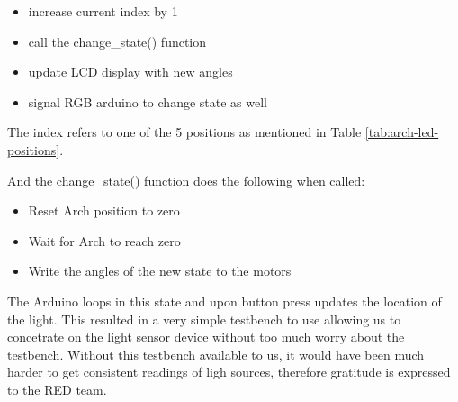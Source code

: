 \begin{itemize}
  \item increase current index by 1
  \item call the change\_state() function 
  \item update LCD display with new angles
  \item signal RGB arduino to change state as well
\end{itemize}

The index refers to one of the 5 positions as mentioned in Table \ref{tab:arch-led-positions}. 

And the change\_state() function does the following when called:
\begin{itemize}
  \item Reset Arch position to zero
  \item Wait for Arch to reach zero
  \item Write the angles of the new state to the motors
\end{itemize}

The Arduino loops in this state and upon button press updates the location of the light. This resulted in a very simple testbench to use allowing us to concetrate on the light sensor device without too much worry about the testbench. Without this testbench available to us, it would have been much harder to get consistent readings of ligh sources, therefore gratitude is expressed to the RED team.

%
